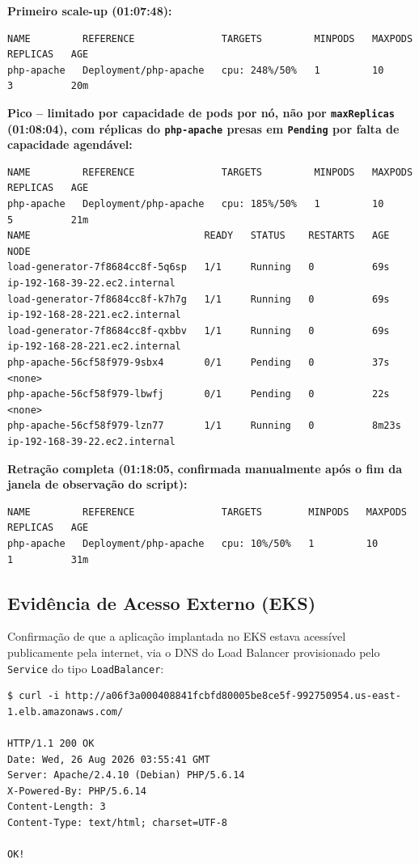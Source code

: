 \documentclass[12pt]{article}
\begin{document}
\textbf{Primeiro scale-up (01:07:48):}
\begin{lstlisting}
NAME         REFERENCE               TARGETS         MINPODS   MAXPODS   REPLICAS   AGE
php-apache   Deployment/php-apache   cpu: 248%/50%   1         10        3          20m
\end{lstlisting}

\textbf{Pico -- limitado por capacidade de pods por nó, não por
\texttt{maxReplicas} (01:08:04), com réplicas do \texttt{php-apache} presas
em \texttt{Pending} por falta de capacidade agendável:}
\begin{lstlisting}
NAME         REFERENCE               TARGETS         MINPODS   MAXPODS   REPLICAS   AGE
php-apache   Deployment/php-apache   cpu: 185%/50%   1         10        5          21m
NAME                              READY   STATUS    RESTARTS   AGE     NODE
load-generator-7f8684cc8f-5q6sp   1/1     Running   0          69s     ip-192-168-39-22.ec2.internal
load-generator-7f8684cc8f-k7h7g   1/1     Running   0          69s     ip-192-168-28-221.ec2.internal
load-generator-7f8684cc8f-qxbbv   1/1     Running   0          69s     ip-192-168-28-221.ec2.internal
php-apache-56cf58f979-9sbx4       0/1     Pending   0          37s     <none>
php-apache-56cf58f979-lbwfj       0/1     Pending   0          22s     <none>
php-apache-56cf58f979-lzn77       1/1     Running   0          8m23s   ip-192-168-39-22.ec2.internal
\end{lstlisting}

\textbf{Retração completa (01:18:05, confirmada manualmente após o fim da
janela de observação do script):}
\begin{lstlisting}
NAME         REFERENCE               TARGETS        MINPODS   MAXPODS   REPLICAS   AGE
php-apache   Deployment/php-apache   cpu: 10%/50%   1         10        1          31m
\end{lstlisting}

\subsection{Evidência de Acesso Externo (EKS)}

Confirmação de que a aplicação implantada no EKS estava acessível
publicamente pela internet, via o DNS do Load Balancer provisionado pelo
\texttt{Service} do tipo \texttt{LoadBalancer}:

\begin{lstlisting}
$ curl -i http://a06f3a000408841fcbfd80005be8ce5f-992750954.us-east-1.elb.amazonaws.com/

HTTP/1.1 200 OK
Date: Wed, 26 Aug 2026 03:55:41 GMT
Server: Apache/2.4.10 (Debian) PHP/5.6.14
X-Powered-By: PHP/5.6.14
Content-Length: 3
Content-Type: text/html; charset=UTF-8

OK!
\end{lstlisting}
\end{document}
